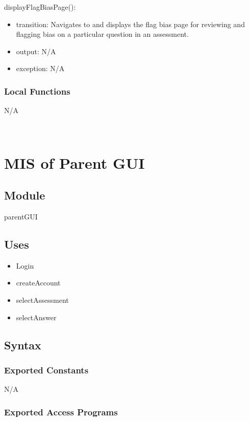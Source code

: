 \documentclass[12pt, titlepage]{article}
\begin{document}
\noindent displayFlagBiasPage():
\begin{itemize}
\item transition: Navigates to and displays the flag bias page for reviewing and flagging bias on a particular question in an assessment.
\item output: N/A
\item exception: N/A
\end{itemize}

\subsubsection{Local Functions}
N/A

~\newpage

\section{MIS of Parent GUI \label{mParentGUI} }

\subsection{Module}

parentGUI

\subsection{Uses}

\begin{itemize}
  \item Login
  \item createAccount
  \item selectAssessment
  \item selectAnswer
\end{itemize}

\subsection{Syntax}

\subsubsection{Exported Constants}

N/A

\subsubsection{Exported Access Programs}
\end{document}
